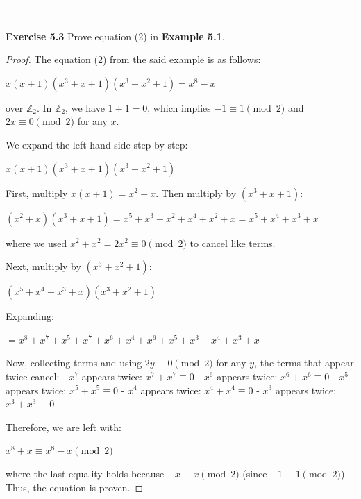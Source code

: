 \documentclass[a4paper]{article}
\begin{document}
\noindent\rule{12cm}{0.4pt}\\
\noindent \textbf{Exercise 5.3} Prove equation (2) in \textbf{Example 5.1}.
\begin{proof}
The equation (2) from the said example is as follows:
\begin{center}
$x(x + 1)(x^3 + x + 1)(x^3 + x^2 + 1) = x^8 - x$
\end{center}
over $\mathbb{Z}_{2}$. In $\mathbb{Z}_2$, we have $1 + 1 = 0$, which implies $-1 \equiv 1 \pmod{2}$ and $2x \equiv 0 \pmod{2}$ for any $x$.

We expand the left-hand side step by step:
\begin{center}
$x(x + 1)(x^3 + x + 1)(x^3 + x^2 + 1)$
\end{center}

First, multiply $x(x + 1) = x^2 + x$. Then multiply by $(x^3 + x + 1)$:
\begin{center}
$(x^2 + x)(x^3 + x + 1) = x^5 + x^3 + x^2 + x^4 + x^2 + x = x^5 + x^4 + x^3 + x$
\end{center}
where we used $x^2 + x^2 = 2x^2 \equiv 0 \pmod{2}$ to cancel like terms.

Next, multiply by $(x^3 + x^2 + 1)$:
\begin{center}
$(x^5 + x^4 + x^3 + x)(x^3 + x^2 + 1)$
\end{center}

Expanding:
\begin{center}
$= x^8 + x^7 + x^5 + x^7 + x^6 + x^4 + x^6 + x^5 + x^3 + x^4 + x^3 + x$
\end{center}

Now, collecting terms and using $2y \equiv 0 \pmod{2}$ for any $y$, the terms that appear twice cancel:
- $x^7$ appears twice: $x^7 + x^7 \equiv 0$
- $x^6$ appears twice: $x^6 + x^6 \equiv 0$
- $x^5$ appears twice: $x^5 + x^5 \equiv 0$
- $x^4$ appears twice: $x^4 + x^4 \equiv 0$
- $x^3$ appears twice: $x^3 + x^3 \equiv 0$

Therefore, we are left with:
\begin{center}
$x^8 + x \equiv x^8 - x \pmod{2}$
\end{center}
where the last equality holds because $-x \equiv x \pmod{2}$ (since $-1 \equiv 1 \pmod{2}$). Thus, the equation is proven.
\end{proof}
\end{document}
